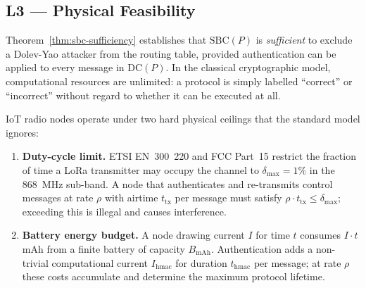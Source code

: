 
\subsection{L3 — Physical Feasibility}
\label{subsec:l3-feasibility}

Theorem~\ref{thm:sbc-sufficiency} establishes that $\mathrm{SBC}(P)$
is \emph{sufficient} to exclude a Dolev-Yao attacker from the routing
table, provided authentication can be applied to every message in
$\mathrm{DC}(P)$.  In the classical cryptographic model, computational
resources are unlimited: a protocol is simply labelled ``correct'' or
``incorrect'' without regard to whether it can be executed at all.

IoT radio nodes operate under two hard physical ceilings that the
standard model ignores:
\begin{enumerate}[label=(\roman*)]
  \item \textbf{Duty-cycle limit.}  ETSI EN~300~220 and FCC Part~15
        restrict the fraction of time a LoRa transmitter may occupy the
        channel to $\delta_{\max} = 1\%$ in the 868~MHz sub-band.  A node
        that authenticates and re-transmits control messages at rate $\rho$
        with airtime $t_{\mathrm{tx}}$ per message must satisfy
        $\rho \cdot t_{\mathrm{tx}} \le \delta_{\max}$; exceeding this is
        illegal and causes interference.

  \item \textbf{Battery energy budget.}  A node drawing current $I$ for
        time $t$ consumes $I \cdot t$ mAh from a finite battery of
        capacity $B_{\mathrm{mAh}}$.  Authentication adds a non-trivial
        computational current $I_{\mathrm{hmac}}$ for duration
        $t_{\mathrm{hmac}}$ per message; at rate $\rho$ these costs
        accumulate and determine the maximum protocol lifetime.
\end{enumerate}

